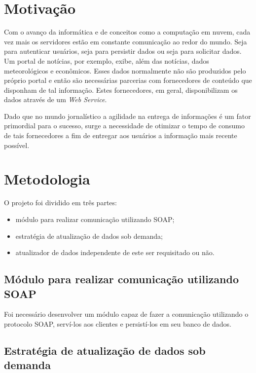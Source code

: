 \section{Motivação}

Com o avanço da informática e de conceitos como a computação em nuvem, cada vez mais os servidores estão em constante comunicação ao redor do mundo. Seja para autenticar usuários, seja para persistir dados ou seja para solicitar dados. Um portal de notícias, por exemplo, exibe, além das notícias, dados meteorológicos e econômicos. Esses dados normalmente não são produzidos pelo próprio portal e então são necessárias parcerias com fornecedores de conteúdo que disponham de tal informação. Estes fornecedores, em geral, disponibilizam os dados através de um \textit{Web Service}.

Dado que no mundo jornalístico a agilidade na entrega de informações é um fator primordial para o sucesso, surge a necessidade de otimizar o tempo de consumo de tais fornecedores a fim de entregar aos usuários a informação mais recente possível.

\section{Metodologia}

O projeto foi dividido em três partes: 

\begin{itemize}
\item módulo para realizar comunicação utilizando SOAP;
\item estratégia de atualização de dados sob demanda;
\item atualizador de dados independente de este ser requisitado ou não.
\end{itemize}


\subsection{Módulo para realizar comunicação utilizando SOAP}

Foi necessário desenvolver um módulo capaz de fazer a comunicação utilizando o protocolo SOAP, serví-los aos clientes e persistí-los em seu banco de dados.

\subsection{Estratégia de atualização de dados sob demanda}

